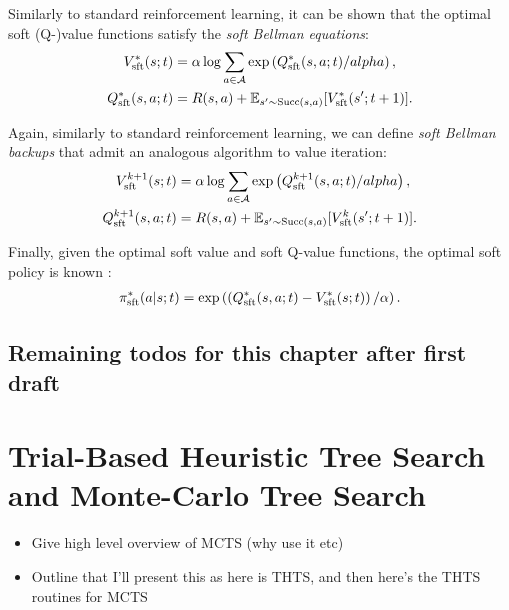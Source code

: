         Similarly to standard reinforcement learning, it can be shown  that the optimal soft (Q-)value functions satisfy the \textit{soft Bellman equations}:
        \begin{align}
            V_{{\textnormal{sft}}}^*(s;t) &= \alpha \log \sum_{a\in\mathcal{A}} \exp\left( Q_{{\textnormal{sft}}}^*(s,a;t) / alpha \right), \\
            Q_{{\textnormal{sft}}}^*(s,a;t) &= R(s,a) + \mathbb{E}_{s'\sim {\textnormal{Succ}(s,a)}} [V_{{\textnormal{sft}}}^*(s';t+1)].
        \end{align} 

        Again, similarly to standard reinforcement learning, we can define \textit{soft Bellman backups} that admit an analogous algorithm to value iteration:
        \begin{align}
            V_{{\textnormal{sft}}}^{k+1}(s;t) &= \alpha \log \sum_{a\in\mathcal{A}} \exp\left( Q_{{\textnormal{sft}}}^{k+1}(s,a;t) / alpha \right), \\
            Q_{{\textnormal{sft}}}^{k+1}(s,a;t) &= R(s,a) + \mathbb{E}_{s'\sim {\textnormal{Succ}(s,a)}} [V_{{\textnormal{sft}}}^k(s';t+1)].
        \end{align}

        Finally, given the optimal soft value and soft Q-value functions, the optimal soft policy is known :
        \begin{align}
            \pi_{{\textnormal{sft}}}^*(a|s;t) = \exp\left(\left(Q_{{\textnormal{sft}}}^*(s,a;t) - V_{{\textnormal{sft}}}^*(s;t)\right) / \alpha \right).
        \end{align}

    \subsection{Remaining todos for this chapter after first draft}










\section{Trial-Based Heuristic Tree Search and Monte-Carlo Tree Search}
\label{sec:2-3-thts}

    \begin{itemize}
        \item Give high level overview of MCTS (why use it etc)
        \item Outline that I'll present this as here is THTS, and then here's the THTS routines for MCTS
    \end{itemize}

